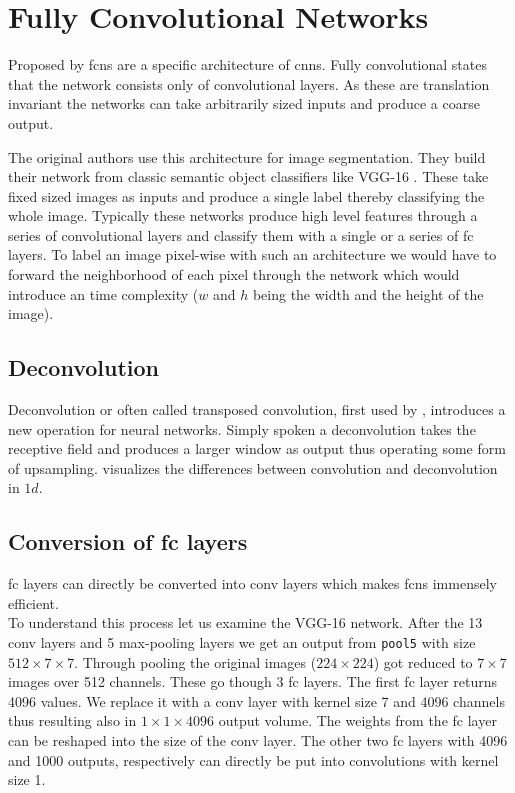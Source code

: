 \section{Fully Convolutional Networks}
\label{sec:concepts:fcn}
Proposed by \citet{long_fully_2015} \glspl{fcn} are a specific architecture of \glspl{cnn}. Fully convolutional states that the network consists only of convolutional layers. As these are translation invariant the networks can take arbitrarily sized inputs and produce a coarse output.

The original authors use this architecture for image segmentation. They build their network from classic semantic object classifiers like VGG-16 \citep{simonyan_very_2014}. These take fixed sized images as inputs and produce a single label thereby classifying the whole image. Typically these networks produce high level features through a series of convolutional layers and classify them with a single or a series of \gls{fc} layers. To label an image pixel-wise with such an architecture we would have to forward the neighborhood of each pixel through the network which would introduce an  time complexity ($w$ and $h$ being the width and the height of the image).

\subsection{Deconvolution} %
\label{sub:conepts:fcn:deconv}

Deconvolution or often called transposed convolution, first used by \citet{zeiler_deconvolutional_2010}, introduces a new operation for neural networks. Simply spoken a deconvolution takes the receptive field and produces a larger window as output thus operating some form of upsampling.  visualizes the differences between convolution and deconvolution in $1d$.

\subsection{Conversion of \gls{fc} layers}
\label{sub:concepts:fcn:fc_conversion}
\gls{fc} layers can directly be converted into \gls{conv} layers which makes \glspl{fcn} immensely efficient.\\
To understand this process let us examine the VGG-16 network. After the 13 \gls{conv} layers and 5 max-pooling layers we get an output from \texttt{pool5} with size $512\times7\times7$. Through pooling the original images ($224\times224$) got reduced to $7\times7$ images over 512 channels. These go though 3 \gls{fc} layers. The first \gls{fc} layer returns 4096 values. We replace it with a \gls{conv} layer with kernel size 7 and 4096 channels thus resulting also in $1\times1\times4096$ output volume. The weights from the \gls{fc} layer can be reshaped into the size of the \gls{conv} layer. The other two \gls{fc} layers with 4096 and 1000 outputs, respectively can directly be put into convolutions with kernel size 1.

